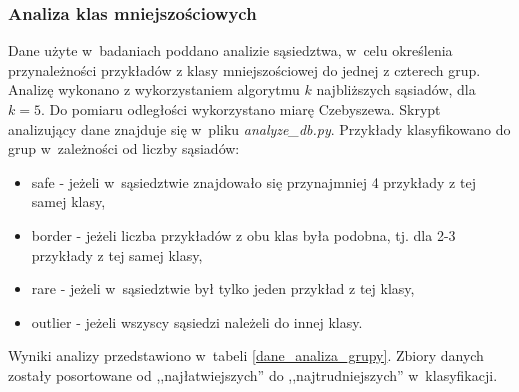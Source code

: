 \subsubsection{Analiza klas mniejszościowych}
Dane użyte w~badaniach poddano analizie sąsiedztwa, w~celu określenia przynależności przykładów z klasy mniejszościowej do jednej z czterech grup. Analizę wykonano z wykorzystaniem algorytmu $k$ najbliższych sąsiadów, dla $k = 5$. Do pomiaru odległości wykorzystano miarę Czebyszewa. Skrypt analizujący dane znajduje się w~pliku \textit{analyze\_db.py}. Przykłady klasyfikowano do grup w~zależności od liczby sąsiadów\cite{przykladyklas}:
\begin{itemize}
	\item safe - jeżeli w~sąsiedztwie znajdowało się przynajmniej 4 przykłady z tej samej klasy,
	\item border - jeżeli liczba przykładów z obu klas była podobna, tj. dla 2-3 przykłady z tej samej klasy,
	\item rare - jeżeli w~sąsiedztwie był tylko jeden przykład z tej klasy,
	\item outlier - jeżeli wszyscy sąsiedzi należeli do innej klasy.
\end{itemize}
Wyniki analizy przedstawiono w~tabeli \ref{dane_analiza_grupy}. Zbiory danych zostały posortowane od ,,najłatwiejszych'' do ,,najtrudniejszych'' w~klasyfikacji.
\newpage
